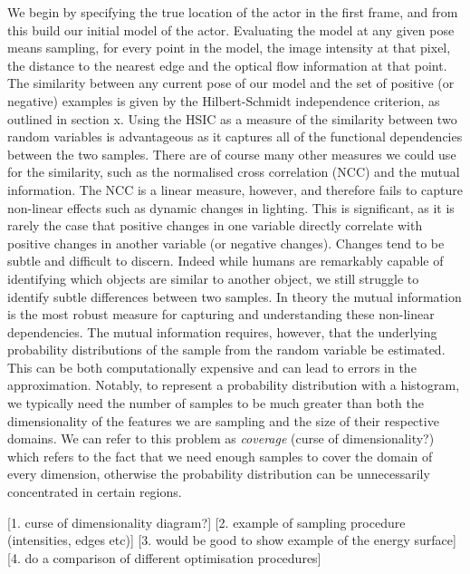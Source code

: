 We begin by specifying the true location of the actor in the first frame, and from this build our initial model of the actor. Evaluating the model at any given pose means sampling, for every point in the model, the image intensity at that pixel, the distance to the nearest edge and the optical flow information at that point. The similarity between any current pose of our model and the set of positive (or negative) examples is given by the Hilbert-Schmidt independence criterion, as outlined in section x. Using the HSIC as a measure of the similarity between two random variables is advantageous as it captures all of the functional dependencies between the two samples. There are of course many other measures we could use for the similarity, such as the normalised cross correlation (NCC) and the mutual information. The NCC is a linear measure, however, and therefore fails to capture non-linear effects such as dynamic changes in lighting. This is significant, as it is rarely the case that positive changes in one variable directly correlate with positive changes in another variable (or negative changes). Changes tend to be subtle and difficult to discern. Indeed while humans are remarkably capable of identifying which objects are similar to another object, we still struggle to identify subtle differences between two samples. In theory the mutual information is the most robust measure for capturing and understanding these non-linear dependencies. The mutual information requires, however, that the underlying probability distributions of the sample from the random variable be estimated. This can be both computationally expensive and can lead to errors in the approximation. Notably, to represent a probability distribution with a histogram, we typically need the number of samples to be much greater than both the dimensionality of the features we are sampling and the size of their respective domains. We can refer to this problem as \textit{coverage} (curse of dimensionality?) which refers to the fact that we need enough samples to cover the domain of every dimension, otherwise the probability distribution can be unnecessarily concentrated in certain regions.



[1. curse of dimensionality diagram?]
[2. example of sampling procedure (intensities, edges etc)]
[3. would be good to show example of the energy surface]
[4. do a comparison of different optimisation procedures]












































